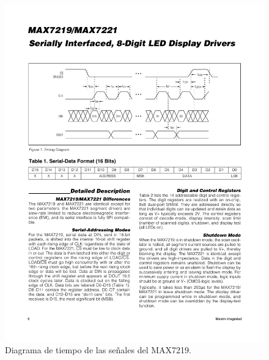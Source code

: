 \begin{figure}[ht!]
	\centering
	\begin{center}
		\includegraphics[width=\textwidth]{imagenes/hw/timingDiagram.pdf}
		\caption{Diagrama de tiempo de las señales del MAX7219.}
		\label{fig:spi-timing-diagram}
	\end{center}
\end{figure}

